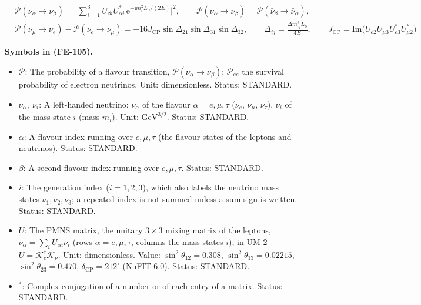\documentclass[
  10pt,
]{article}
\providecommand{\tightlist}{%
  \setlength{\itemsep}{0pt}\setlength{\parskip}{0pt}}
\begin{document}
\[
\begin{aligned}
&\mathcal{P}(\nu_\alpha\to\nu_\beta) = \Big\lvert\sum_{i=1}^{3}U_{\beta i}U^*_{\alpha i}\,
 \mathrm{e}^{-\mathrm{i}m_i^2L_{\mathrm{b}}/(2E)}\Big\rvert^2,\qquad
 \mathcal{P}(\nu_\alpha\to\nu_\beta) = \mathcal{P}(\bar\nu_\beta\to\bar\nu_\alpha),\\
&\mathcal{P}(\nu_\mu\to\nu_e) - \mathcal{P}(\nu_e\to\nu_\mu) =
 -16J_{\mathrm{CP}}\sin\Delta_{21}\sin\Delta_{31}\sin\Delta_{32},\qquad
 \Delta_{ij} = \frac{\Delta m_{ij}^2L_{\mathrm{b}}}{4E},\qquad
 J_{\mathrm{CP}} = \mathrm{Im}\big(U_{e2}U_{\mu3}U_{e3}^*U_{\mu2}^*\big)
\end{aligned} \tag{FE-105}
\]

\textbf{Symbols in (FE-105).}

\begin{itemize}
\tightlist
\item
  \(\mathcal{P}\): The probability of a flavour transition,
  \(\mathcal{P}(\nu_\alpha \to \nu_\beta)\); \(\mathcal{P}_{ee}\) the
  survival probability of electron neutrinos. Unit: dimensionless.
  Status: STANDARD.
\item
  \(\nu_\alpha,\ \nu_i\): A left-handed neutrino: \(\nu_\alpha\) of the
  flavour \(\alpha = e, \mu, \tau\) (\(\nu_e\), \(\nu_\mu\),
  \(\nu_\tau\)), \(\nu_i\) of the mass state \(i\) (mass \(m_i\)). Unit:
  \(\mathrm{GeV}^{3/2}\). Status: STANDARD.
\item
  \(\alpha\): A flavour index running over \(e, \mu, \tau\) (the flavour
  states of the leptons and neutrinos). Status: STANDARD.
\item
  \(\beta\): A second flavour index running over \(e, \mu, \tau\).
  Status: STANDARD.
\item
  \(i\): The generation index (\(i = 1, 2, 3\)), which also labels the
  neutrino mass states \(\nu_1, \nu_2, \nu_3\); a repeated index is not
  summed unless a sum sign is written. Status: STANDARD.
\item
  \(U\): The PMNS matrix, the unitary \(3 \times 3\) mixing matrix of
  the leptons, \(\nu_\alpha = \sum_iU_{\alpha i}\nu_i\) (rows
  \(\alpha = e, \mu, \tau\), columns the mass states \(i\)); in UM-2
  \(U = \mathcal{K}_e^\dagger\mathcal{K}_\nu\). Unit: dimensionless.
  Value: \(\sin^2\theta_{12} = 0.308\), \(\sin^2\theta_{13} = 0.02215\),
  \(\sin^2\theta_{23} = 0.470\), \(\delta_{\mathrm{CP}} = 212^\circ\)
  (NuFIT 6.0). Status: STANDARD.
\item
  \({}^*\): Complex conjugation of a number or of each entry of a
  matrix. Status: STANDARD.

\end{itemize}
\end{document}
